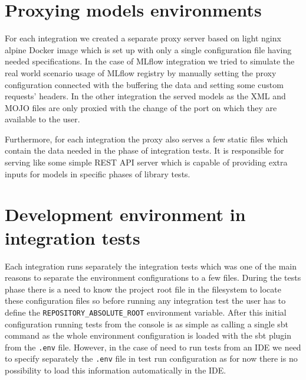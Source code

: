 \section{Proxying models environments}

For each integration we created a separate proxy server based on light nginx alpine Docker image which
is set up with only a single configuration file having needed specifications. In the case of MLflow
integration we tried to simulate the real world scenario usage of MLflow registry by manually setting
the proxy configuration connected with the buffering the data and setting some custom requests’ headers.
In the other integration the served models as the XML and MOJO files are only proxied with the change of
the port on which they are available to the user.

Furthermore, for each integration the proxy also serves a few static files which contain the data needed
in the phase of integration tests. It is responsible for serving like some simple REST API server which
is capable of providing extra inputs for models in specific phases of library tests.

\section{Development environment in integration tests}

Each integration runs separately the integration tests which was one of the main reasons to separate
the environment configurations to a few files. During the tests phase there is a need to know the project
root file in the filesystem to locate these configuration files so before running any integration test
the user has to define the \texttt{REPOSITORY\_ABSOLUTE\_ROOT} environment variable. After this initial
configuration running tests from the console is as simple as calling a single sbt command as the whole
environment configuration is loaded with the sbt plugin from the \texttt{.env} file. However, in the case of need
to run tests from an IDE we need to specify separately the \texttt{.env} file in test run configuration as for now
there is no possibility to load this information automatically in the IDE.

